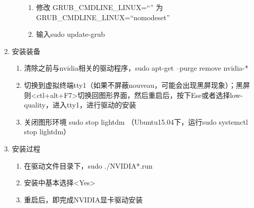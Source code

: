 \begin{enumerate}
\begin{itemize}
\begin{enumerate}
	    \item 修改 GRUB\_CMDLINE\_LINUX=``'' 为 GRUB\_CMDLINE\_LINUX=``nomodeset''
	    \item 输入sudo update-grub
	    \end{enumerate}	
	\end{itemize}
\item 安装装备
	\begin{enumerate}
	\item 清除之前与nvidia相关的驱动程序，sudo apt-get --purge remove nvidia-*  
	\item <ctl+alt+F1>切换到虚拟终端tty1（如果不屏蔽nouveau，可能会出现黑屏现象）；黑屏则<ctl+alt+F7>切换回图形界面，然后重启后，按下Ese或者选择low-quality，进入tty1，进行驱动的安装
	\item 关闭图形环境  sudo stop lightdm （Ubuntu15.04下，运行sudo systemctl stop lightdm）
	\end{enumerate}

\item 安装过程 
	\begin{enumerate}
	\item 在驱动文件目录下，sudo ./NVIDIA*.run
	\item 安装中基本选择<Yes>
	\item 重启后，即完成NVIDIA显卡驱动安装
	\end{enumerate}
\end{enumerate}


